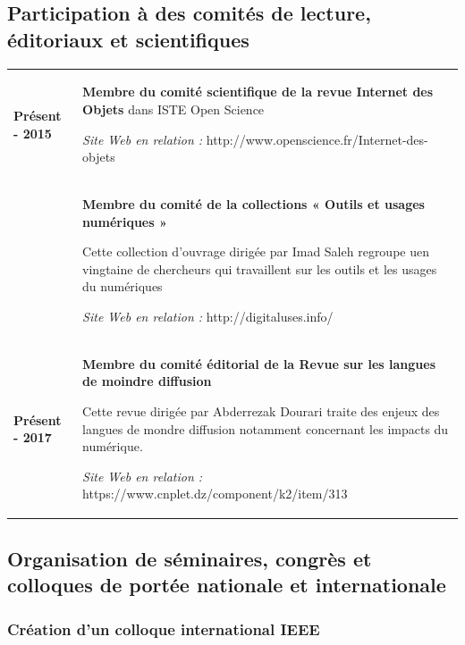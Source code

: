 \documentclass[
  a4paper,
  DIV=11,
  numbers=noendperiod]{scrreprt}
\begin{document}
\subsection{Participation à des comités de lecture, éditoriaux et
scientifiques}\label{participation-uxe0-des-comituxe9s-de-lecture-uxe9ditoriaux-et-scientifiques}

\begin{longtable}[]{@{}
  >{\raggedright\arraybackslash}p{}
  >{\raggedright\arraybackslash}p{}@{}}
\toprule\noalign{}
\endhead
\bottomrule\noalign{}
\endlastfoot
\textbf{Présent - 2015} & \textbf{Membre du comité scientifique de la
revue Internet des Objets} dans ISTE Open Science

\emph{Site Web en relation :}
http://www.openscience.fr/Internet-des-objets \\
& \textbf{Membre du comité de la collections « Outils et usages
numériques »}

Cette collection d'ouvrage dirigée par Imad Saleh regroupe uen vingtaine
de chercheurs qui travaillent sur les outils et les usages du numériques

\emph{Site Web en relation :} http://digitaluses.info/ \\
\textbf{Présent - 2017} & \textbf{Membre du comité éditorial de la Revue
sur les langues de moindre diffusion}

Cette revue dirigée par Abderrezak Dourari traite des enjeux des langues
de mondre diffusion notamment concernant les impacts du numérique.

\emph{Site Web en relation :}
https://www.cnplet.dz/component/k2/item/313 \\
\end{longtable}

\subsection{Organisation de séminaires, congrès et colloques de portée
nationale et
internationale}\label{organisation-de-suxe9minaires-congruxe8s-et-colloques-de-portuxe9e-nationale-et-internationale}

\subsubsection{Création d'un colloque international
IEEE}\label{cruxe9ation-dun-colloque-international-ieee}
\end{document}
